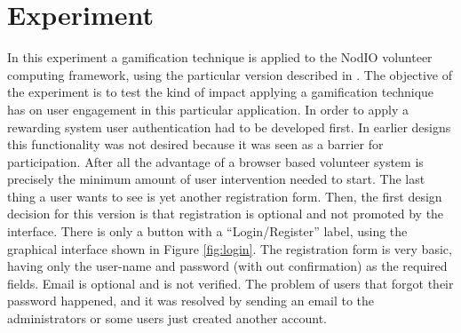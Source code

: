 \documentclass{llncs}
\begin{document}
\section{Experiment}
\label{sec:experiments}

In this experiment a gamification technique is applied to 
the {\sf NodIO} volunteer computing framework, using the 
particular version described in \cite{DBLP:conf/gecco/MereloCGCRV16,2016arXiv160101607M}.
The objective of the experiment is to test the kind of impact 
applying a gamification technique has on user engagement in this
particular application. In order to apply a rewarding system
user authentication had to be developed first. In earlier designs
this functionality was not desired because it was seen as a barrier 
for participation. After all the advantage of a browser based volunteer system
is precisely the minimum amount of user intervention needed to start.
The last thing a user wants to see is yet another registration form.
Then, the first design decision for this version is that registration is optional
and not promoted by the interface. There is only a button with a ``Login/Register'' label,
using the graphical interface shown in Figure \ref{fig:login}. 
The registration form is very basic, having only the user-name and 
password (with out confirmation) as the required fields. Email is optional
and is not verified. The problem of users that forgot their password
happened, and it was resolved by sending an email to the administrators
or some users just created another account. 
\end{document}
